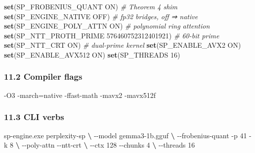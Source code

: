 \documentclass[
  11pt,
]{article}
\newenvironment{Shaded}{}{}
\newcommand{\CommentTok}[1]{\textcolor[rgb]{0.38,0.63,0.69}{\textit{#1}}}
\newcommand{\ExtensionTok}[1]{#1}
\newcommand{\KeywordTok}[1]{\textcolor[rgb]{0.00,0.44,0.13}{\textbf{#1}}}
\newcommand{\NormalTok}[1]{#1}
\begin{document}
\begin{Shaded}
\begin{Highlighting}[]
\KeywordTok{set}\NormalTok{(SP\_FROBENIUS\_QUANT       ON)                            }\CommentTok{\# Theorem 4 shim}
\KeywordTok{set}\NormalTok{(SP\_ENGINE\_NATIVE         OFF)                           }\CommentTok{\# fp32 bridges, off ⇒ native}
\KeywordTok{set}\NormalTok{(SP\_ENGINE\_POLY\_ATTN      ON)                            }\CommentTok{\# polynomial ring attention}
\KeywordTok{set}\NormalTok{(SP\_NTT\_PROTH\_PRIME       576460752312401921)            }\CommentTok{\# 60{-}bit prime}
\KeywordTok{set}\NormalTok{(SP\_NTT\_CRT               ON)                            }\CommentTok{\# dual{-}prime kernel}
\KeywordTok{set}\NormalTok{(SP\_ENABLE\_AVX2           ON)}
\KeywordTok{set}\NormalTok{(SP\_ENABLE\_AVX512         ON)}
\KeywordTok{set}\NormalTok{(SP\_THREADS               16)}
\end{Highlighting}
\end{Shaded}

\hypertarget{compiler-flags}{%
\subsubsection{11.2 Compiler flags}\label{compiler-flags}}

\begin{Shaded}
\begin{Highlighting}[]
\ExtensionTok{{-}O3}\NormalTok{ {-}march=native {-}ffast{-}math {-}mavx2 {-}mavx512f}
\end{Highlighting}
\end{Shaded}

\hypertarget{cli-verbs}{%
\subsubsection{11.3 CLI verbs}\label{cli-verbs}}

\begin{Shaded}
\begin{Highlighting}[]
\ExtensionTok{sp{-}engine.exe}\NormalTok{ perplexity{-}sp }\KeywordTok{\textbackslash{}}
    \ExtensionTok{{-}{-}model}\NormalTok{ gemma3{-}1b.gguf }\KeywordTok{\textbackslash{}}
    \ExtensionTok{{-}{-}frobenius{-}quant}\NormalTok{ {-}p 41 {-}k 8 }\KeywordTok{\textbackslash{}}
    \ExtensionTok{{-}{-}poly{-}attn}\NormalTok{ {-}{-}ntt{-}crt }\KeywordTok{\textbackslash{}}
    \ExtensionTok{{-}{-}ctx}\NormalTok{ 128 {-}{-}chunks 4 }\KeywordTok{\textbackslash{}}
    \ExtensionTok{{-}{-}threads}\NormalTok{ 16}
\end{Highlighting}
\end{Shaded}
\end{document}
